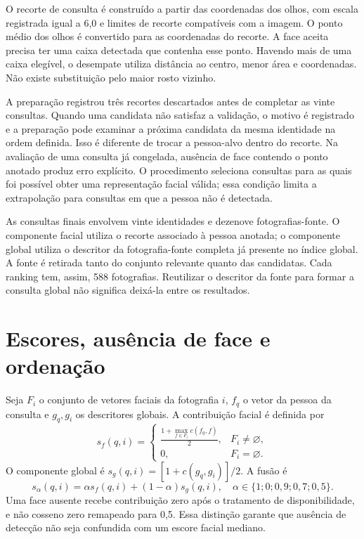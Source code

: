 O recorte de consulta é construído a partir das coordenadas dos olhos, com escala registrada igual a 6,0 e limites de recorte compatíveis com a imagem. O ponto médio dos olhos é convertido para as coordenadas do recorte. A face aceita precisa ter uma caixa detectada que contenha esse ponto. Havendo mais de uma caixa elegível, o desempate utiliza distância ao centro, menor área e coordenadas. Não existe substituição pelo maior rosto vizinho.

A preparação registrou três recortes descartados antes de completar as vinte consultas. Quando uma candidata não satisfaz a validação, o motivo é registrado e a preparação pode examinar a próxima candidata da mesma identidade na ordem definida. Isso é diferente de trocar a pessoa-alvo dentro do recorte. Na avaliação de uma consulta já congelada, ausência de face contendo o ponto anotado produz erro explícito. O procedimento seleciona consultas para as quais foi possível obter uma representação facial válida; essa condição limita a extrapolação para consultas em que a pessoa não é detectada.

As consultas finais envolvem vinte identidades e dezenove fotografias-fonte. O componente facial utiliza o recorte associado à pessoa anotada; o componente global utiliza o descritor da fotografia-fonte completa já presente no índice global. A fonte é retirada tanto do conjunto relevante quanto das candidatas. Cada ranking tem, assim, 588 fotografias. Reutilizar o descritor da fonte para formar a consulta global não significa deixá-la entre os resultados.

\section{Escores, ausência de face e ordenação}
Seja $F_i$ o conjunto de vetores faciais da fotografia $i$, $f_q$ o vetor da pessoa da consulta e $g_q,g_i$ os descritores globais. A contribuição facial é definida por
\begin{equation}\label{eq:face}
 s_f(q,i)=\begin{cases}
 \displaystyle\frac{1+\max_{f\in F_i}c(f_q,f)}{2},&F_i\ne\varnothing,\\[4pt]
 0,&F_i=\varnothing.
 \end{cases}
\end{equation}
O componente global é $s_g(q,i)=[1+c(g_q,g_i)]/2$. A fusão é
\begin{equation}\label{eq:fusao}
 s_{\alpha}(q,i)=\alpha s_f(q,i)+(1-\alpha)s_g(q,i),
 \quad\alpha\in\{1;0;0{,}9;0{,}7;0{,}5\}.
\end{equation}
Uma face ausente recebe contribuição zero após o tratamento de disponibilidade, e não cosseno zero remapeado para 0,5. Essa distinção garante que ausência de detecção não seja confundida com um escore facial mediano.

